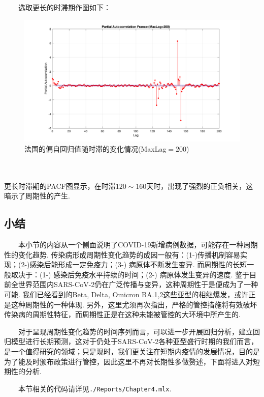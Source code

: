 \documentclass[a4paper, titlepage]{article}
\begin{document}
　　选取更长的时滞期作图如下：\\
\begin{minipage}{\textwidth}
    \begin{figure}[H]
        \centering
        \includegraphics[width=\textwidth]{./images/France_PACF_2.png}
        \vspace{-3em}
        \caption{法国的偏自回归值随时滞的变化情况(MaxLag$=200$)}
        \label{images:France_ACF}
    \end{figure}
\end{minipage}\\\quad\\
更长时滞期的PACF图显示，在时滞$120\sim 160$天时，出现了强烈的正负相关，这暗示了周期性的产生.
\subsection{小结}
　　本小节的内容从一个侧面说明了COVID-19新增病例数据，可能存在一种周期性的变化趋势. 传染病形成周期性变化趋势的成因一般有：(1-)传播机制容易实现；(2-)感染后能形成一定免疫力；(3-) 病原体不断发生变异. 而周期性的长短一般取决于：(1-) 感染后免疫水平持续的时间；(2-) 病原体发生变异的速度. 鉴于目前全世界范围内SARS-CoV-2仍在广泛传播与变异，这种周期性于是便成为了一种可能. 我们已经看到的Beta, Delta, Omicron BA.1,2这些亚型的相继爆发，或许正是这种周期性的一种体现. 另外，这里尤须再次指出，严格的管控措施将有效破坏传染病的周期性特征，而周期性正是在这种未能被管控的大环境中所产生的.

　　对于呈现周期性变化趋势的时间序列而言，可以进一步开展回归分析，建立回归模型进行长期预测，这对于仍处于SARS-CoV-2各种亚型盛行时期的我们而言，是一个值得研究的领域；只是现时，我们更关注在短期内疫情的发展情况，目的是为了能及时颁布政策进行管控，因此这里不再对长期性多做赘述，下面将进入对短期性的分析.

　　本节相关的代码请详见\texttt{./Reports/Chapter4.mlx}.
\end{document}
